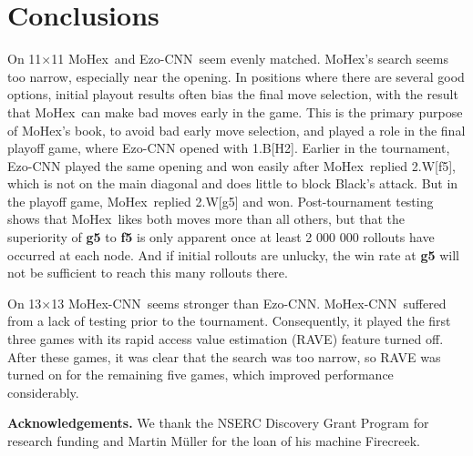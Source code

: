 \documentclass{icga}
\def\Ec{\mbox{\sc Ezo-CNN}}
\def\Mx{\mbox{\sc MoHex}}
\def\Mc{\mbox{\sc MoHex-CNN}}
\begin{document}
\section{Conclusions}
On 11$\times$11 \Mx\ and \Ec\ seem evenly matched.
\Mx{}'s search seems too narrow, especially near the opening.
In positions where there are several good options,
initial playout results often bias the final move selection,
with the result that \Mx\ can make bad moves early in the game.
This is the primary purpose of \Mx's book, to 
avoid bad early move selection,
and played a role in the final playoff game, where \Ec{} opened 
with 1.B[H2].  Earlier in the tournament, \Ec{} played the same opening
and won easily after \Mx\ replied 2.W[f5], which is not on the main diagonal
and does little to block Black's attack.
But in the playoff game, \Mx\ replied 2.W[g5] and won.
Post-tournament testing shows that \Mx\ likes both moves more than all others,
but that the superiority of {\bf g5} to {\bf f5} is only apparent
once at least 2 000 000 rollouts have occurred at each node.
And if initial rollouts are unlucky, the win rate at {\bf g5} will not
be sufficient to reach this many rollouts there.

On 13$\times$13 \Mc\ seems stronger than \Ec.
\Mc\ suffered from a lack of testing prior to the tournament.
Consequently, it played the first three games with its rapid access value estimation (RAVE)
feature turned off. After these games, it was clear that the search
was too narrow, so RAVE was turned on for the remaining five games, which improved
performance considerably.

{\bf Acknowledgements.}
We thank the NSERC Discovery Grant Program for research funding and
Martin M\"{u}ller for the loan of his machine Firecreek.

\end{document}

